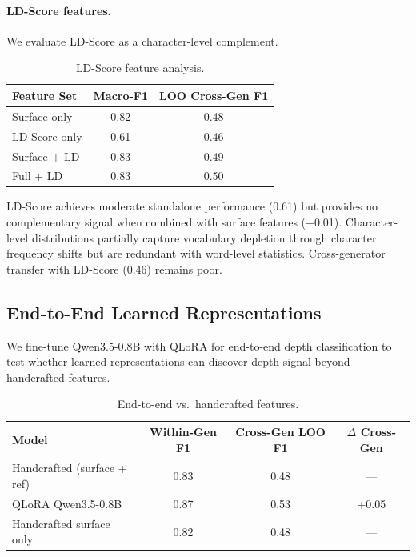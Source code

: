 \documentclass[letterpaper]{article}
\begin{document}
\paragraph{LD-Score features.}
We evaluate LD-Score \citep{tulchinskii2024ldscore} as a character-level complement.

\begin{table}[h]
\centering
\caption{LD-Score feature analysis.}
\label{tab:ldscore}
\begin{tabular}{lcc}
\toprule
Feature Set & Macro-F1 & LOO Cross-Gen F1 \\
\midrule
Surface only & 0.82 & 0.48 \\
LD-Score only & 0.61 & 0.46 \\
Surface + LD & 0.83 & 0.49 \\
Full + LD & 0.83 & 0.50 \\
\bottomrule
\end{tabular}
\end{table}

LD-Score achieves moderate standalone performance (0.61) but provides no complementary signal when combined with surface features (+0.01). Character-level distributions partially capture vocabulary depletion through character frequency shifts but are redundant with word-level statistics. Cross-generator transfer with LD-Score (0.46) remains poor.

\subsection{End-to-End Learned Representations}
\label{sec:e2e}

We fine-tune Qwen3.5-0.8B with QLoRA for end-to-end depth classification to test whether learned representations can discover depth signal beyond handcrafted features.

\begin{table}[h]
\centering
\caption{End-to-end vs.\ handcrafted features.}
\label{tab:e2e}
\begin{tabular}{lccc}
\toprule
Model & Within-Gen F1 & Cross-Gen LOO F1 & $\Delta$ Cross-Gen \\
\midrule
Handcrafted (surface + ref) & 0.83 & 0.48 & --- \\
QLoRA Qwen3.5-0.8B & 0.87 & 0.53 & +0.05 \\
Handcrafted surface only & 0.82 & 0.48 & --- \\
\bottomrule
\end{tabular}
\end{table}
\end{document}

